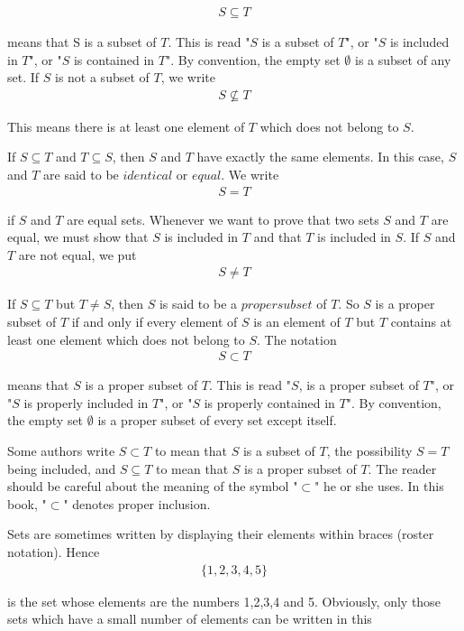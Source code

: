 \documentclass[11pt]{amsbook}
\begin{document}

\begin{align*}
	 S \subseteq T 
\end{align*}

means that S is a subset of $T$. This is read "$S$ is a subset of $T$", or "$S$ is included in $T$", or "$S$ is contained in $T$". By convention, the empty set $\emptyset$ is a subset of any set. If $S$ is not a subset of $T$, we write
\begin{align*}
	S \nsubseteq T
\end{align*}

This means there is at least one element of $T$ which does not belong to $S$.\par

If $S \subseteq T$ and $T \subseteq S$, then $S$ and $T$ have exactly the same elements. In this case, $S$ and $T$ are said to be $identical$ or $equal$. We write
\begin{align*}
	S = T
\end{align*}

if $S$ and $T$ are equal sets. Whenever we want to prove that two sets $S$ and $T$ are equal, we must show that $S$ is included in $T$ and that $T$ is included in $S$. If $S$ and $T$ are not equal, we put
\begin{align*}
	S \neq T
\end{align*}

If $S\subseteq T$ but $T \neq S$, then $S$ is said to be a $proper subset$ of $T$. So $S$ is a proper subset of $T$ if and only if every element of $S$ is an element of $T$ but $T$ contains at least one element which does not belong to $S$. The notation
\begin{align*}
	S \subset T
\end{align*}

means that $S$ is a proper subset of $T$. This is read "$S$, is a proper subset of $T$", or "$S$ is properly included in $T$", or "$S$ is properly contained in $T$". By convention, the empty set $\emptyset$ is a proper subset of every set except itself. \par

Some authors write $S \subset T$ to mean that $S$ is a subset of $T$, the possibility $S = T$ being included, and $S \subseteq T$ to mean that $S$ is a proper subset of $T$. The reader should be careful about the meaning of the symbol "$\subset$" he or she uses. In this book, "$\subset$" denotes proper inclusion.\par

Sets are sometimes written by displaying their elements within braces (roster notation). Hence
\begin{align*}
	\{ 1,2,3,4,5 \}
\end{align*}

is the set whose elements are the numbers 1,2,3,4 and 5. Obviously, only those sets which have a small number of elements can be written in this
\end{document}
